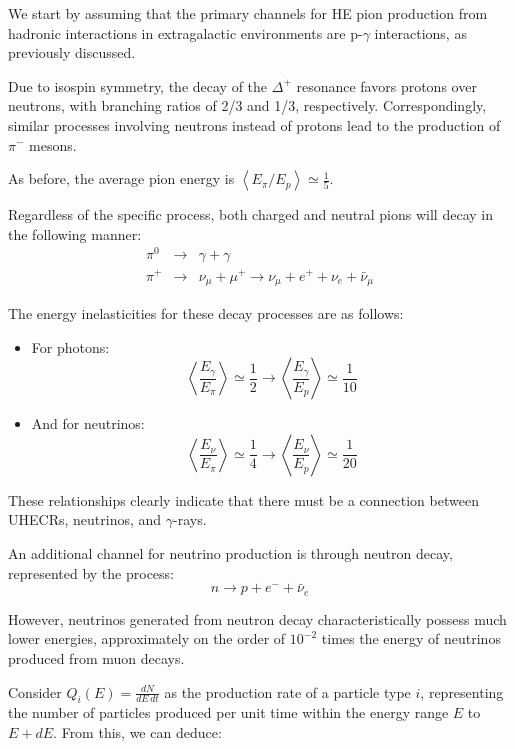 We start by assuming that the primary channels for HE pion production from hadronic interactions in extragalactic environments are p-$\gamma$ interactions, as previously discussed.

Due to isospin symmetry, the decay of the $\Delta^+$ resonance favors protons over neutrons, with branching ratios of 2/3 and 1/3, respectively. Correspondingly, similar processes involving neutrons instead of protons lead to the production of $\pi^-$ mesons.

As before, the average pion energy is \( \left\langle {E_\pi}/{E_p} \right\rangle \simeq \frac{1}{5} \).

Regardless of the specific process, both charged and neutral pions will decay in the following manner:
%
\begin{eqnarray*}
\pi^0 &\rightarrow& \gamma + \gamma \\
\pi^+ &\rightarrow& \nu_\mu + \mu^+ \rightarrow \nu_\mu + e^+ + \nu_e + \bar\nu_\mu 
\end{eqnarray*}

The energy inelasticities for these decay processes are as follows:
%
\begin{itemize}
\item For photons:
\[
\left\langle \frac{E_\gamma}{E_\pi} \right\rangle \simeq \frac{1}{2} \rightarrow \left\langle \frac{E_\gamma}{E_p} \right\rangle \simeq \frac{1}{10}
\]

\item And for neutrinos:
\[
\left\langle \frac{E_\nu}{E_\pi} \right\rangle \simeq \frac{1}{4} \rightarrow \left\langle \frac{E_\nu}{E_p} \right\rangle \simeq \frac{1}{20}
\]
\end{itemize}

These relationships clearly indicate that there must be a connection between UHECRs, neutrinos, and $\gamma$-rays.

An additional channel for neutrino production is through neutron decay, represented by the process:
%
\[
n \rightarrow p + e^- + \bar\nu_e
\]

However, neutrinos generated from neutron decay characteristically possess much lower energies, approximately on the order of \(10^{-2}\) times the energy of neutrinos produced from muon decays.

Consider \( Q_i(E) = \frac{dN}{dE \, dt} \) as the production rate of a particle type \( i \), representing the number of particles produced per unit time within the energy range \( E \) to \( E + dE \). From this, we can deduce:

